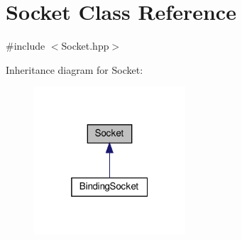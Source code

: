 \hypertarget{classSocket}{}\section{Socket Class Reference}
\label{classSocket}


{\ttfamily \#include $<$Socket.\+hpp$>$}



Inheritance diagram for Socket\+:\nopagebreak
\begin{figure}[H]
\begin{center}
\leavevmode
\includegraphics[width=160pt]{classSocket__inherit__graph}
\end{center}
\end{figure}
